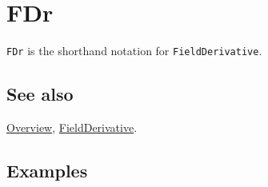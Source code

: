 \documentclass[../FeynCalcManual.tex]{subfiles}
\begin{document}
\hypertarget{fdr}{
\section{FDr}\label{fdr}}

\texttt{FDr} is the shorthand notation for \texttt{FieldDerivative}.

\subsection{See also}

\hyperlink{toc}{Overview}, \hyperlink{fieldderivative}{FieldDerivative}.

\subsection{Examples}
\end{document}

